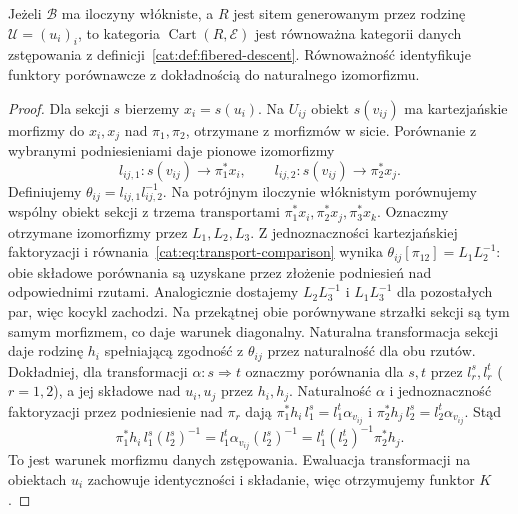 \begin{twierdzenie}\label{cat:thm:descent-family-sieve}
Jeżeli $\mathcal B$ ma iloczyny włókniste, a $R$ jest sitem generowanym przez rodzinę $\mathcal U=(u_i)_i$, to kategoria $\operatorname{Cart}(R,\mathcal E)$ jest równoważna kategorii danych zstępowania z definicji~\ref{cat:def:fibered-descent}. Równoważność identyfikuje funktory porównawcze z dokładnością do naturalnego izomorfizmu.
\end{twierdzenie}
\begin{proof}
Dla sekcji $s$ bierzemy $x_i=s(u_i)$. Na $U_{ij}$ obiekt $s(v_{ij})$ ma kartezjańskie morfizmy do $x_i,x_j$ nad $\pi_1,\pi_2$, otrzymane z morfizmów w sicie. Porównanie z wybranymi podniesieniami daje pionowe izomorfizmy
\[
 l_{ij,1}:s(v_{ij})\longrightarrow\pi_1^*x_i,\qquad
 l_{ij,2}:s(v_{ij})\longrightarrow\pi_2^*x_j.
\]
Definiujemy $\theta_{ij}=l_{ij,1}l_{ij,2}^{-1}$. Na potrójnym iloczynie włóknistym porównujemy wspólny obiekt sekcji z trzema transportami $\pi_1^*x_i,\pi_2^*x_j,\pi_3^*x_k$. Oznaczmy otrzymane izomorfizmy przez $L_1,L_2,L_3$. Z jednoznaczności kartezjańskiej faktoryzacji i równania~\eqref{cat:eq:transport-comparison} wynika $\theta_{ij}[\pi_{12}]=L_1L_2^{-1}$: obie składowe porównania są uzyskane przez złożenie podniesień nad odpowiednimi rzutami. Analogicznie dostajemy $L_2L_3^{-1}$ i $L_1L_3^{-1}$ dla pozostałych par, więc kocykl zachodzi. Na przekątnej obie porównywane strzałki sekcji są tym samym morfizmem, co daje warunek diagonalny. Naturalna transformacja sekcji daje rodzinę $h_i$ spełniającą zgodność z $\theta_{ij}$ przez naturalność dla obu rzutów. Dokładniej, dla transformacji $\alpha:s\Rightarrow t$ oznaczmy porównania dla $s,t$ przez $l^s_r,l^t_r$ ($r=1,2$), a jej składowe nad $u_i,u_j$ przez $h_i,h_j$. Naturalność $\alpha$ i jednoznaczność faktoryzacji przez podniesienie nad $\pi_r$ dają $\pi_1^*h_i\,l^s_1=l^t_1\alpha_{v_{ij}}$ i $\pi_2^*h_j\,l^s_2=l^t_2\alpha_{v_{ij}}$. Stąd
\[
 \pi_1^*h_i\,l^s_1(l^s_2)^{-1}
 =l^t_1\alpha_{v_{ij}}(l^s_2)^{-1}
 =l^t_1(l^t_2)^{-1}\pi_2^*h_j.
\]
To jest warunek morfizmu danych zstępowania. Ewaluacja transformacji na obiektach $u_i$ zachowuje identyczności i składanie, więc otrzymujemy funktor $K$.


\end{proof}
